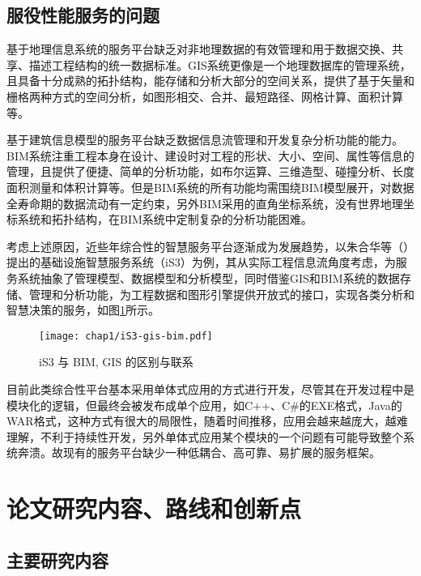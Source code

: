 \subsection{服役性能服务的问题}

基于地理信息系统的服务平台缺乏对非地理数据的有效管理和用于数据交换、共享、描述工程结构的统一数据标准。GIS系统更像是一个地理数据库的管理系统，且具备十分成熟的拓扑结构，能存储和分析大部分的空间关系，提供了基于矢量和栅格两种方式的空间分析，如图形相交、合并、最短路径、网格计算、面积计算等。

基于建筑信息模型的服务平台缺乏数据信息流管理和开发复杂分析功能的能力。BIM系统注重工程本身在设计、建设时对工程的形状、大小、空间、属性等信息的管理，且提供了便捷、简单的分析功能，如布尔运算、三维造型、碰撞分析、长度面积测量和体积计算等。但是BIM系统的所有功能均需围绕BIM模型展开，对数据全寿命期的数据流动有一定约束，另外BIM采用的直角坐标系统，没有世界地理坐标系统和拓扑结构，在BIM系统中定制复杂的分析功能困难。

考虑上述原因，近些年综合性的智慧服务平台逐渐成为发展趋势，以朱合华等（\citeyear{朱合华2018智慧基础设施}）提出的基础设施智慧服务系统（iS3）为例，其从实际工程信息流角度考虑，为服务系统抽象了管理模型、数据模型和分析模型，同时借鉴GIS和BIM系统的数据存储、管理和分析功能，为工程数据和图形引擎提供开放式的接口，实现各类分析和智慧决策的服务，如图\ref{fig:iS3-gis-bim}所示。

\begin{figure}[!h]
	\centering
	\texttt{[image: chap1/iS3-gis-bim.pdf]}
	\caption{iS3 与 BIM, GIS 的区别与联系}
	\label{fig:iS3-gis-bim}
\end{figure}

目前此类综合性平台基本采用单体式应用的方式进行开发，尽管其在开发过程中是模块化的逻辑，但最终会被发布成单个应用，如C++、C\#的EXE格式，Java的WAR格式，这种方式有很大的局限性，随着时间推移，应用会越来越庞大，越难理解，不利于持续性开发，另外单体式应用某个模块的一个问题有可能导致整个系统奔溃。故现有的服务平台缺少一种低耦合、高可靠、易扩展的服务框架。

\section{论文研究内容、路线和创新点}

\subsection{主要研究内容}

